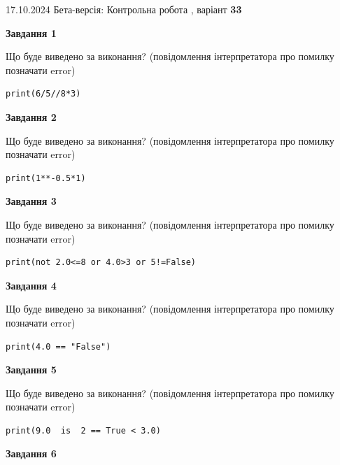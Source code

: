 \documentclass[12pt, ukrainian]{article}
\begin{document}
{\Large{17.10.2024 Бета-версія: Контрольна робота , варіант  \No \textbf { 33 }\par}}
{
\begin {large}
{\begin {center}\textbf{Завдання 1}\end {center}}

Що буде виведено за виконання? (повідомлення інтерпретатора про помилку позначати error)\par
\begin{verbatim}
print(6/5//8*3)
\end{verbatim}

{\begin {center}\textbf{Завдання 2}\end {center}}

Що буде виведено за виконання? (повідомлення інтерпретатора про помилку позначати error)\par
\begin{verbatim}
print(1**-0.5*1)
\end{verbatim}

{\begin {center}\textbf{Завдання 3}\end {center}}

Що буде виведено за виконання? (повідомлення інтерпретатора про помилку позначати error)\par
\begin{verbatim}
print(not 2.0<=8 or 4.0>3 or 5!=False)
\end{verbatim}

{\begin {center}\textbf{Завдання 4}\end {center}}

Що буде виведено за виконання? (повідомлення інтерпретатора про помилку позначати error)\par
\begin{verbatim}
print(4.0 == "False")
\end{verbatim}

{\begin {center}\textbf{Завдання 5}\end {center}}

Що буде виведено за виконання? (повідомлення інтерпретатора про помилку позначати error)\par
\begin{verbatim}
print(9.0  is  2 == True < 3.0)
\end{verbatim}

{\begin {center}\textbf{Завдання 6}\end {center}}


\end{large}}
\end{document}
